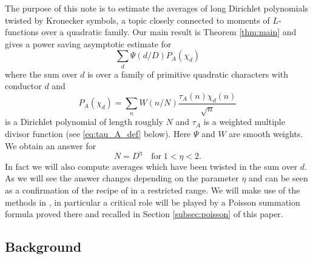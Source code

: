 \documentclass[12pt]{amsart}
\begin{document}
	The purpose of this note is to estimate the averages of long Dirichlet polynomials twisted by Kronecker symbols, a topic closely connected to moments of $L$-functions over a quadratic family. Our main result is Theorem \ref{thm:main} and gives a power saving asymptotic estimate for
	\begin{equation}
		\label{eq:quad_sum}
		\sum_{d} \Psi(d/D) P_A(\chi_d)
	\end{equation}
	where the sum over $d$ is over a family of primitive quadratic characters with conductor $d$ and
	$$
	P_A(\chi_d) = \sum_n W(n/N) \frac{\tau_A(n) \chi_d(n)}{\sqrt{n}}
	$$
	is a Dirichlet polynomial of length roughly $N$ and $\tau_A$ is a weighted multiple divisor function (see \eqref{eq:tau_A_def} below). Here $\Psi$ and $W$ are smooth weights. We obtain an answer for 
	$$
	N = D^\eta\quad \textrm{for}\; 1 < \eta < 2.
	$$ 
	In fact we will also compute averages which have been twisted in the sum over $d$. As we will see the answer changes depending on the parameter $\eta$ and can be seen as a confirmation of the recipe of \cite{CFKRS} in a restricted range. We will make use of the methods in \cite{Sou}, in particular a critical role will be played by a Poisson summation formula proved there and recalled in Section \ref{subsec:poisson} of this paper.
	
	\subsection{Background}
	\label{subsec:background}
	
\end{document}
